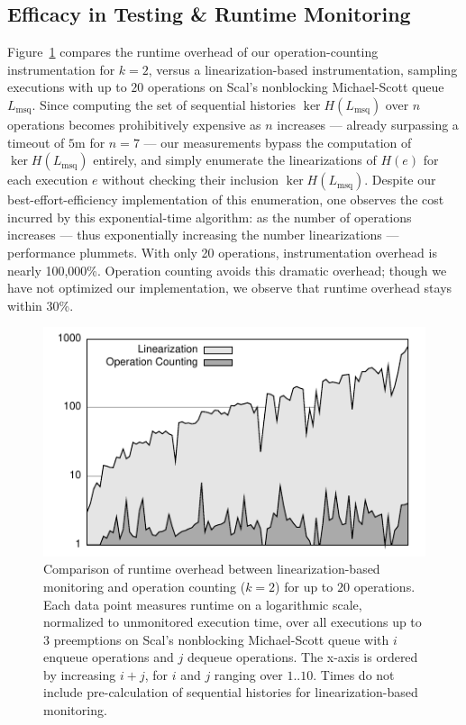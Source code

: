 \subsection{Efficacy in Testing \& Runtime Monitoring}
\label{sec:exp:dynamic}

Figure~\ref{fig:data:runtime} compares the runtime overhead of our
operation-counting instrumentation for $k=2$, versus a linearization-based
instrumentation, sampling executions with up to $20$ operations on Scal's
nonblocking Michael-Scott queue $L_\mathrm{msq}$. Since computing the set of
sequential histories $\ker H(L_\mathrm{msq})$ over $n$ operations becomes
prohibitively expensive as $n$ increases --- already surpassing a timeout of
$5$m for $n=7$ --- our measurements bypass the computation of $\ker
H(L_\mathrm{msq})$ entirely, and simply enumerate the linearizations of $H(e)$
for each execution $e$ without checking their inclusion $\ker
H(L_\mathrm{msq})$. Despite our best-effort-efficiency implementation of this
enumeration, one observes the cost incurred by this exponential-time algorithm:
as the number of operations increases --- thus exponentially increasing the
number linearizations --- performance plummets. With only 20 operations,
instrumentation overhead is nearly 100,000\%. Operation counting avoids this
dramatic overhead; though we have not optimized our implementation, we observe
that runtime overhead stays within 30\%.

\begin{figure}
  \centering
  \includegraphics[width=\linewidth]{figures/lin-vs-counting-time}
  \caption{Comparison of runtime overhead between linearization-based monitoring
    and operation counting ($k=2$) for up to $20$ operations. Each data point
    measures runtime on a logarithmic scale, normalized to unmonitored
    execution time, over all executions up to $3$ preemptions on Scal's
    nonblocking Michael-Scott queue with $i$ enqueue operations and $j$ dequeue
    operations. The x-axis is ordered by increasing $i+j$, for $i$ and $j$
    ranging over $1..10$. Times do not include pre-calculation of sequential
    histories for linearization-based monitoring.
  }
  \label{fig:data:runtime}
\end{figure}

